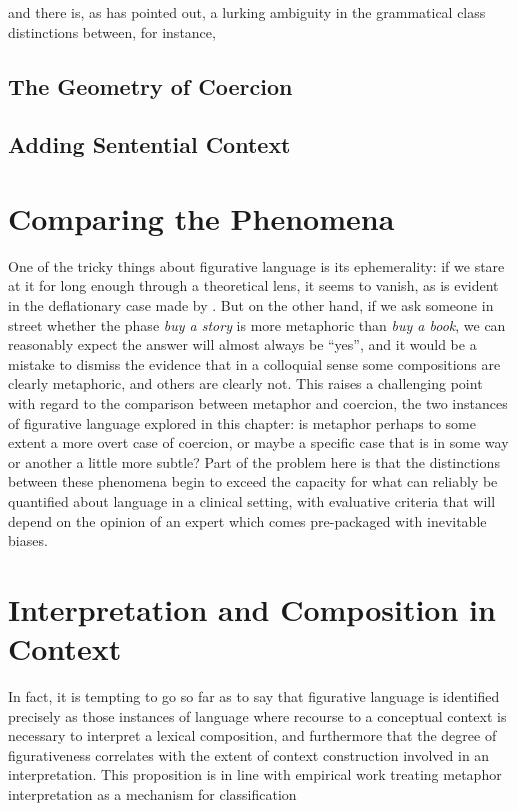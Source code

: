 and there is, as \cite{Langacker} has pointed out, a lurking ambiguity in the grammatical class distinctions between, for instance, 

\subsection{The Geometry of Coercion}

\subsection{Adding Sentential Context}

\section{Comparing the Phenomena}
One of the tricky things about figurative language is its ephemerality: if we stare at it for long enough through a theoretical lens, it seems to vanish, as is evident in the deflationary case made by \cite{WilsonEA}.  But on the other hand, if we ask someone in street whether the phase \emph{buy a story} is more metaphoric than \emph{buy a book}, we can reasonably expect the answer will almost always be ``yes'', and it would be a mistake to dismiss the evidence that in a colloquial sense some compositions are clearly metaphoric, and others are clearly not.  This raises a challenging point with regard to the comparison between metaphor and coercion, the two instances of figurative language explored in this chapter: is metaphor perhaps to some extent a more overt case of coercion, or maybe a specific case that is in some way or another a little more subtle?  Part of the problem here is that the distinctions between these phenomena begin to exceed the capacity for what can reliably be quantified about language in a clinical setting, with evaluative criteria that will depend on the opinion of an expert which comes pre-packaged with inevitable biases.

\section{Interpretation and Composition in Context}

In fact, it is tempting to go so far as to say that figurative language is identified precisely as those instances of language where recourse to a conceptual context is necessary to interpret a lexical composition, and furthermore that the degree of figurativeness correlates with the extent of context construction involved in an interpretation.  This proposition is in line with  empirical work treating metaphor interpretation as a mechanism for classification

